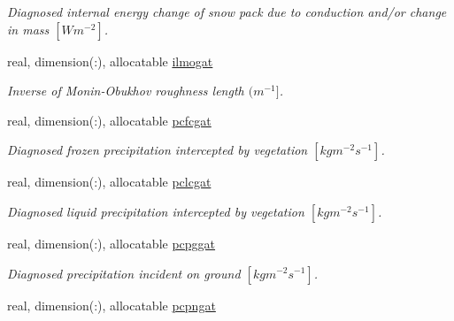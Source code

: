 \begin{DoxyCompactItemize}
\begin{DoxyCompactList}\small\item\em Diagnosed internal energy change of snow pack due to conduction and/or change in mass $[W m^{-2} ]$. \end{DoxyCompactList}\item 
\hypertarget{structclass__statevars_1_1class__gather_af2e193934d263ff67fe66ae2d23771b7}{}real, dimension(\+:), allocatable \hyperlink{structclass__statevars_1_1class__gather_af2e193934d263ff67fe66ae2d23771b7}{ilmogat}\label{structclass__statevars_1_1class__gather_af2e193934d263ff67fe66ae2d23771b7}

\begin{DoxyCompactList}\small\item\em Inverse of Monin-\/\+Obukhov roughness length $(m^{-1} ]$. \end{DoxyCompactList}\item 
\hypertarget{structclass__statevars_1_1class__gather_a08661070d9c7a79b31d2e5732bf220c4}{}real, dimension(\+:), allocatable \hyperlink{structclass__statevars_1_1class__gather_a08661070d9c7a79b31d2e5732bf220c4}{pcfcgat}\label{structclass__statevars_1_1class__gather_a08661070d9c7a79b31d2e5732bf220c4}

\begin{DoxyCompactList}\small\item\em Diagnosed frozen precipitation intercepted by vegetation $[kg m^{-2} s^{-1} ]$. \end{DoxyCompactList}\item 
\hypertarget{structclass__statevars_1_1class__gather_a0d8251aa5a86826505b6a68eec13427c}{}real, dimension(\+:), allocatable \hyperlink{structclass__statevars_1_1class__gather_a0d8251aa5a86826505b6a68eec13427c}{pclcgat}\label{structclass__statevars_1_1class__gather_a0d8251aa5a86826505b6a68eec13427c}

\begin{DoxyCompactList}\small\item\em Diagnosed liquid precipitation intercepted by vegetation $[kg m^{-2} s^{-1} ]$. \end{DoxyCompactList}\item 
\hypertarget{structclass__statevars_1_1class__gather_a20ed03141ce6379d3fa9dc518cad8a84}{}real, dimension(\+:), allocatable \hyperlink{structclass__statevars_1_1class__gather_a20ed03141ce6379d3fa9dc518cad8a84}{pcpggat}\label{structclass__statevars_1_1class__gather_a20ed03141ce6379d3fa9dc518cad8a84}

\begin{DoxyCompactList}\small\item\em Diagnosed precipitation incident on ground $[kg m^{-2} s^{-1} ]$. \end{DoxyCompactList}\item 
\hypertarget{structclass__statevars_1_1class__gather_a7f4fed35946fa137a85b458c02dea913}{}real, dimension(\+:), allocatable \hyperlink{structclass__statevars_1_1class__gather_a7f4fed35946fa137a85b458c02dea913}{pcpngat}\label{structclass__statevars_1_1class__gather_a7f4fed35946fa137a85b458c02dea913}


\end{DoxyCompactItemize}
